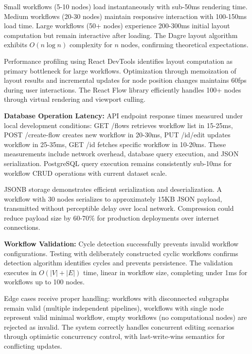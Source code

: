 \documentclass[12pt]{article}
\begin{document}
Small workflows (5-10 nodes) load instantaneously with sub-50ms rendering time. Medium workflows (20-30 nodes) maintain responsive interaction with 100-150ms load time. Large workflows (50+ nodes) experience 200-300ms initial layout computation but remain interactive after loading. The Dagre layout algorithm exhibits $O(n \log n)$ complexity for $n$ nodes, confirming theoretical expectations.

Performance profiling using React DevTools identifies layout computation as primary bottleneck for large workflows. Optimization through memoization of layout results and incremental updates for node position changes maintains 60fps during user interactions. The React Flow library efficiently handles 100+ nodes through virtual rendering and viewport culling.

\hspace{\parindent}\textbf{Database Operation Latency:} API endpoint response times measured under local development conditions: GET /flows retrieves workflow list in 15-25ms, POST /create-flow creates new workflow in 20-30ms, PUT /{id}/edit updates workflow in 25-35ms, GET /{id} fetches specific workflow in 10-20ms. These measurements include network overhead, database query execution, and JSON serialization. PostgreSQL query execution remains consistently sub-10ms for workflow CRUD operations with current dataset scale.

JSONB storage demonstrates efficient serialization and deserialization. A workflow with 30 nodes serializes to approximately 15KB JSON payload, transmitted without perceptible delay over local network. Compression could reduce payload size by 60-70\% for production deployments over internet connections.

\hspace{\parindent}\textbf{Workflow Validation:} Cycle detection successfully prevents invalid workflow configurations. Testing with deliberately constructed cyclic workflows confirms detection algorithm identifies cycles and prevents persistence. The validation executes in $O(|V| + |E|)$ time, linear in workflow size, completing under 1ms for workflows up to 100 nodes.

Edge cases receive proper handling: workflows with disconnected subgraphs remain valid (multiple independent pipelines), workflows with single node represent valid minimal workflow, empty workflows (no computational nodes) are rejected as invalid. The system correctly handles concurrent editing scenarios through optimistic concurrency control, with last-write-wins semantics for conflicting updates.
\end{document}
